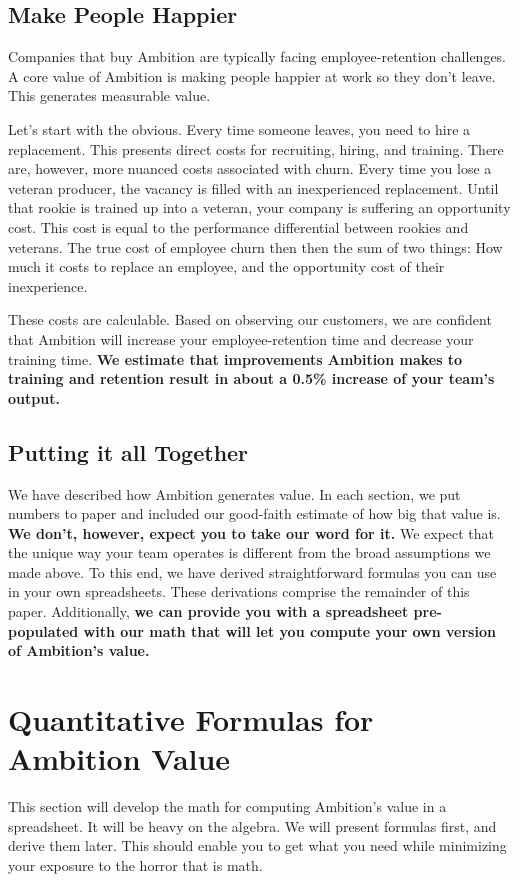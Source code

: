 \documentclass[paper=a4, fontsize=11pt abstract]{scrartcl}
\numberwithin{equation}{section}		%
\numberwithin{figure}{section}			%
\numberwithin{table}{section}				%
\begin{document}
\subsection{Make People Happier}
Companies that buy Ambition are typically facing employee-retention challenges.
A core value of Ambition is making people happier at work so they don't leave.
This generates measurable value.

Let's start with the obvious.  Every time someone leaves, you need to hire a replacement.
This presents direct costs for recruiting, hiring, and training.
There are, however, more nuanced costs associated with churn.
Every time you lose a veteran producer, the vacancy is filled with an inexperienced replacement.
Until that rookie is trained up into a veteran, your company is suffering an opportunity cost.
This cost is equal to the performance differential between rookies and veterans.
The true cost of employee churn then then the sum of two things:
How much it costs to replace an employee, and the opportunity cost of their inexperience.

These costs are calculable.
Based on observing our customers, we are confident that Ambition will increase your employee-retention time and decrease your training time.
\textbf{We estimate that improvements Ambition makes to training and retention result in about a 0.5\% increase of your team's output.}

\subsection{Putting it all Together}
We have described how Ambition generates value.
In each section, we put numbers to paper and included our good-faith estimate of how big that value is.
\textbf{We don't, however, expect you to take our word for it.}
We expect that the unique way your team operates is different from the broad assumptions we made above.
To this end, we have derived straightforward formulas you can use in your own spreadsheets.
These derivations comprise the remainder of this paper.
Additionally, \textbf{we can provide you with a spreadsheet pre-populated with our math that will let you compute your own version of Ambition's value.}

\section{Quantitative Formulas for Ambition Value}
This section will develop the math for computing Ambition's value in a spreadsheet.
It will be heavy on the algebra.
We will present formulas first, and derive them later.
This should enable you to get what you need while minimizing your exposure to the horror that is math.
\end{document}

